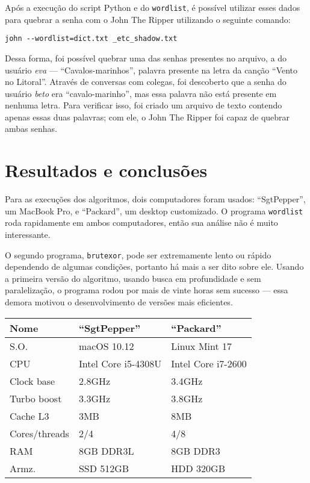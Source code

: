 \documentclass{sig-alternate-05-2015}
\begin{document}
Após a execução do script Python e do \texttt{wordlist}, é possível utilizar esses dados para quebrar a senha com o John The Ripper utilizando o seguinte comando:

\begin{verbatim}
john --wordlist=dict.txt _etc_shadow.txt
\end{verbatim}

Dessa forma, foi possível quebrar uma das senhas presentes no arquivo, a do usuário \textit{eva} — ``Cavalos-marinhos'', palavra presente na letra da canção ``Vento no Litoral''.
Através de conversas com colegas, foi descoberto que a senha do usuário \textit{beto} era ``cavalo-marinho'', mas essa palavra não está presente em nenhuma letra.
Para verificar isso, foi criado um arquivo de texto contendo apenas essas duas palavras; com ele, o John The Ripper foi capaz de quebrar ambas senhas.

\section{Resultados e conclusões}

Para as execuções dos algoritmos, dois computadores foram usados: ``SgtPepper'', um MacBook Pro, e ``Packard'', um desktop customizado.
O programa \texttt{wordlist} roda rapidamente em ambos computadores, então sua análise não é muito interessante.

O segundo programa, \texttt{brutexor}, pode ser extremamente lento ou rápido dependendo de algumas condições, portanto há mais a ser dito sobre ele.
Usando a primeira versão do algoritmo, usando busca em profundidade e sem paralelização, o programa rodou por mais de vinte horas sem sucesso — essa demora motivou o desenvolvimento de versões mais eficientes.

\begin{center}
  \begin{tabular}{ l | l | l }
    \hline
    \textbf{Nome} & ``SgtPepper'' & ``Packard'' \\ \hline \hline
    S.O. & macOS 10.12 & Linux Mint 17 \\ \hline
    CPU & Intel Core i5-4308U & Intel Core i7-2600 \\ \hline
    Clock base & 2.8GHz & 3.4GHz \\ \hline
    Turbo boost & 3.3GHz & 3.8GHz \\ \hline
    Cache L3 & 3MB & 8MB \\ \hline
    Cores/threads & 2/4 & 4/8 \\ \hline
    RAM & 8GB DDR3L & 8GB DDR3 \\ \hline
    Armz. & SSD 512GB & HDD 320GB \\ \hline
    \hline
  \end{tabular}
\end{center}
\end{document}
